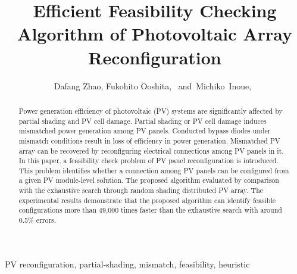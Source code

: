\documentclass[journal]{IEEEtran}
\begin{document}
\title{Efficient Feasibility Checking Algorithm of Photovoltaic Array Reconfiguration}

\author{Dafang Zhao,
        Fukohito Ooshita,~
        and~Michiko~Inoue,~}%


% 


\maketitle

\begin{abstract}
  Power generation efficiency of photovoltaic (PV) systems are significantly affected by partial shading and PV cell damage.
  Partial shading or PV cell damage induces mismatched power generation among PV panels.
  Conducted bypass diodes under mismatch conditions result in loss of efficiency in power generation.
  Mismatched PV array can be recovered by reconfiguring electrical connections among PV panels in it.
  In this paper, a feasibility check problem of PV panel reconfiguration is introduced.
  This problem identifies whether a connection among PV panels can be configured from a given PV module-level solution.
  The proposed algorithm evaluated by comparison with the exhaustive search through random shading distributed PV array.
  The experimental results demonstrate that the proposed algorithm can identify feasible configurations more than 49,000 times faster than the exhaustive search with around 0.5\% errors.
\end{abstract}

\begin{IEEEkeywords}
PV reconfiguration, partial-shading, mismatch, feasibility, heuristic
\end{IEEEkeywords}
\end{document}

